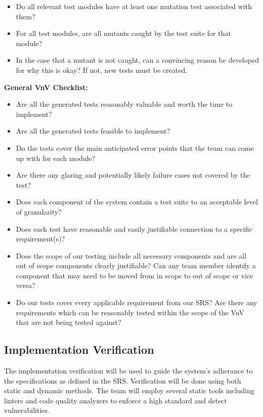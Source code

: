 \documentclass[12pt, titlepage]{article}
\begin{document}
\begin{itemize}
  \item{Do all relevant test modules have at least one mutation test associated with them?}
  \item{For all test modules, are all mutants caught by the test suite for that module?}
  \item{In the case that a mutant is not caught, can a convincing reason be developed for why this is okay? If not, new tests must be created.}
\end{itemize}

\textbf{General VnV Checklist:}

\begin{itemize}
  \item{Are all the generated tests reasonably valuable and worth the time to implement?}
  \item{Are all the generated tests feasible to implement?}
  \item{Do the tests cover the main anticipated error points that the team can come up with for each module?}
  \item{Are there any glaring and potentially likely failure cases not covered by the test?}
  \item{Does each component of the system contain a test suite to an acceptable level of granularity?}
  \item{Does each test have reasonable and easily justifiable connection to a specific requirement(s)?}
  \item{Does the scope of our testing include all necessary components and are all out of scope components clearly
  justifiable? Can any team member identify a component that may need to be moved from in scope to out of scope or vice versa?}
  \item{Do our tests cover every applicable requirement from our SRS? Are there any requirements which can be reasonably tested
  within the scope of the VnV that are not being tested against?}
\end{itemize}

\subsection{Implementation Verification}

The implementation verification will be used to guide the system's adherance to the specifications 
as defined in the SRS. Verification will be done using both static and dynamic methods. The team will 
employ several static tools including linters and code quality analyzers to enforce a high standard 
and detect vulnerabilities. 
\end{document}
